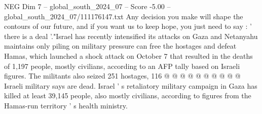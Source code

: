 \begin{textsample}{NEG Dim 7 – global\_south\_2024\_07 – Score -5.00 – global\_south\_2024\_07/111176147.txt}
Any decision you make will shape the contours of our future, and if you want us to keep hope, you just need to say : ' there is a deal '."Israel has recently intensified its attacks on Gaza and Netanyahu maintains only piling on military pressure can free the hostages and defeat Hamas, which launched a shock attack on October 7 that resulted in the deaths of 1,197 people, mostly civilians, according to an AFP tally based on Israeli figures.
The militants also seized 251 hostages, 116 @ @ @ @ @ @ @ @ @ @ Israeli military says are dead.
Israel ' s retaliatory military campaign in Gaza has killed at least 39,145 people, also mostly civilians, according to figures from the Hamas-run territory ' s health ministry.

\end{textsample}
